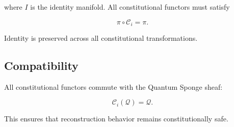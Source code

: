 where $I$ is the identity manifold. All constitutional functors must satisfy

\[
\pi \circ \mathcal{C}_i = \pi.
\]

Identity is preserved across all constitutional transformations.


\subsection{Compatibility}

All constitutional functors commute with the Quantum Sponge sheaf:

\[
\mathcal{C}_i(\mathcal{Q}) = \mathcal{Q}.
\]

This ensures that reconstruction behavior remains constitutionally safe.

